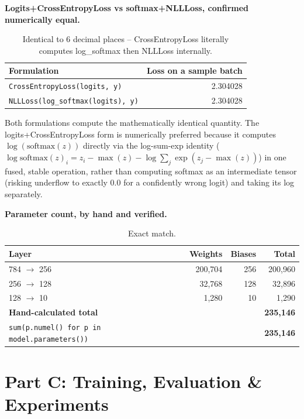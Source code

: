 \documentclass[11pt,a4paper]{article}
\begin{document}
\textbf{Logits+CrossEntropyLoss vs softmax+NLLLoss, confirmed numerically equal.}

\begin{table}[H]
\centering
\begin{tabular}{lr}
\toprule
\textbf{Formulation} & \textbf{Loss on a sample batch} \\
\midrule
\texttt{CrossEntropyLoss(logits, y)} & 2.304028 \\
\texttt{NLLLoss(log\_softmax(logits), y)} & 2.304028 \\
\bottomrule
\end{tabular}
\caption{Identical to 6 decimal places -- CrossEntropyLoss literally computes log\_softmax then NLLLoss internally.}
\end{table}

Both formulations compute the mathematically identical quantity. The
logits+CrossEntropyLoss form is numerically preferred because it computes
$\log(\text{softmax}(z))$ directly via the log-sum-exp identity
($\log\text{softmax}(z)_i = z_i - \max(z) - \log\sum_j\exp(z_j-\max(z))$) in one fused,
stable operation, rather than computing softmax as an intermediate tensor (risking
underflow to exactly 0.0 for a confidently wrong logit) and taking its log separately.

\textbf{Parameter count, by hand and verified.}

\begin{table}[H]
\centering
\begin{tabular}{lrrr}
\toprule
\textbf{Layer} & \textbf{Weights} & \textbf{Biases} & \textbf{Total} \\
\midrule
784 $\to$ 256 & 200,704 & 256 & 200,960 \\
256 $\to$ 128 & 32,768 & 128 & 32,896 \\
128 $\to$ 10  & 1,280 & 10 & 1,290 \\
\midrule
\textbf{Hand-calculated total} & & & \textbf{235,146} \\
\texttt{sum(p.numel() for p in model.parameters())} & & & \textbf{235,146} \\
\bottomrule
\end{tabular}
\caption{Exact match.}
\end{table}

\section*{Part C: Training, Evaluation \& Experiments}
\end{document}
